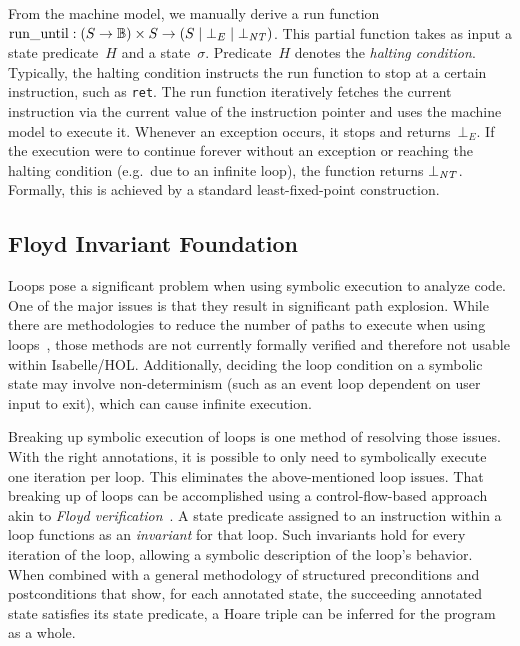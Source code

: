From the machine model, we manually derive a run function%
$\operatorname{run\_until}:(S\rightarrow\mathbb{B})\times S\rightarrow(S\mid\bot_E\mid\bot_{\mathit{NT}})$.%
This partial function takes as input a state predicate~$H$ and a state~$\sigma$.%
Predicate~$H$ denotes the \emph{halting condition}.%
Typically, the halting condition instructs the run function to stop
at a certain instruction, such as \lstinline{ret}.
The run function iteratively fetches the current instruction
via the current value of the instruction pointer
and uses the machine model to execute it.
Whenever an exception occurs, it stops and returns~$\bot_E$.
If the execution were to continue forever
without an exception or reaching the halting condition
(e.g.\ due to an infinite loop),
the function returns $\bot_{\mathit{NT}}$.
Formally, this is achieved by a standard least-fixed-point construction.












\subsection{Floyd Invariant Foundation}\label{se:cfg_invariant}
Loops pose a significant problem when using symbolic execution to analyze code.%
One of the major issues is that they result in significant path explosion.
While there are methodologies to reduce the number of paths to execute
when using loops~\citep{saxena2009lese,obdrzalek2011efficient},
those methods are not currently formally verified
and therefore not usable within Isabelle/HOL.%
Additionally, deciding the loop condition on a symbolic state
may involve non-determinism (such as an event loop dependent on user input to exit),%
which can cause infinite execution.

Breaking up symbolic execution of loops is one method of resolving those issues.
With the right annotations,
it is possible to only need to symbolically execute one iteration per loop.
This eliminates the above-mentioned loop issues.
That breaking up of loops can be accomplished using a control-flow-based approach
akin to \emph{Floyd verification}~\citep{floyd1967assigning}.%
A state predicate assigned to an instruction within a loop%
functions as an \emph{invariant} for that loop.%
Such invariants hold for every iteration of the loop,
allowing a symbolic description of the loop's behavior.
When combined with a general methodology
of structured preconditions and postconditions that show,%
%
for each annotated state, the succeeding annotated state satisfies its state predicate,
a Hoare triple can be inferred for the program as a whole.%

